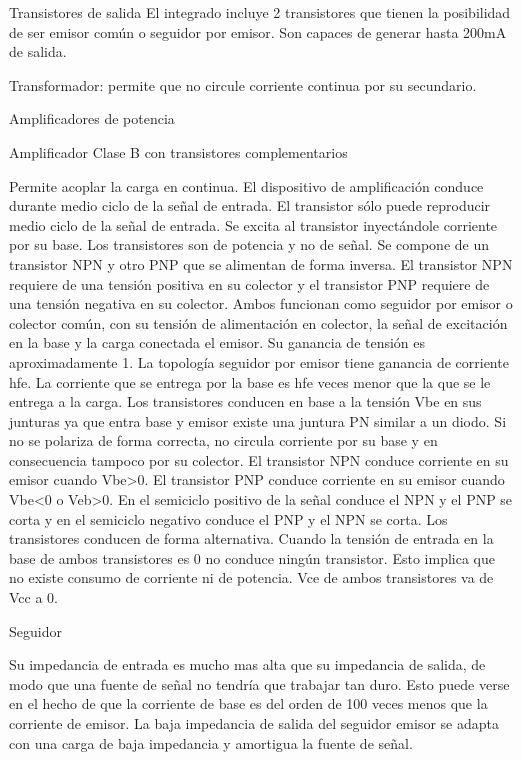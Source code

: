 Transistores de salida
El integrado incluye 2 transistores que tienen la posibilidad de ser emisor común o seguidor por emisor. 
Son capaces de generar hasta 200mA de salida. 


Transformador: permite que no circule corriente continua por su secundario. 

Amplificadores de potencia

Amplificador Clase B con transistores complementarios

Permite acoplar la carga en continua. 
El dispositivo de amplificación conduce durante medio ciclo de la señal de entrada. 
El transistor sólo puede reproducir medio ciclo de la señal de entrada. 
Se excita al transistor inyectándole corriente por su base.
Los transistores son de potencia y no de señal. 
Se compone de un transistor NPN y otro PNP que se alimentan de forma inversa.
El transistor NPN requiere de una tensión positiva en su colector y 
el transistor PNP requiere de una tensión negativa en su colector.
Ambos funcionan como seguidor por emisor o colector común, con su tensión de alimentación en colector, la señal de excitación en la base y la carga conectada el emisor. 
Su ganancia de tensión es aproximadamente 1. 
La topología seguidor por emisor tiene ganancia de corriente hfe. 
La corriente que se entrega por la base es hfe veces menor que la que se le entrega a la carga. 
Los transistores conducen en base a la tensión Vbe en sus junturas ya que entra base y emisor existe una juntura PN similar a un diodo. 
Si no se polariza de forma correcta, no circula corriente por su base y en consecuencia tampoco por su colector. 
El transistor NPN conduce corriente en su emisor cuando Vbe>0. 
El transistor PNP conduce corriente en su emisor cuando Vbe<0 o Veb>0.
En el semiciclo positivo de la señal conduce el NPN y el PNP se corta y en el semiciclo negativo conduce el PNP y el NPN se corta. 
Los transistores conducen de forma alternativa. 
Cuando la tensión de entrada en la base de ambos transistores es 0 no conduce ningún transistor. 
Esto implica que no existe consumo de corriente ni de potencia. 
Vce de ambos transistores va de Vcc a 0.

Seguidor

Su impedancia de entrada es mucho mas alta que su impedancia de salida, de modo que una fuente de señal no tendría que trabajar tan duro.
 Esto puede verse en el hecho de que la corriente de base es del orden de 100 veces menos que la corriente de emisor. 
 La baja impedancia de salida del seguidor emisor se adapta con una carga de baja impedancia y amortigua la fuente de señal.

